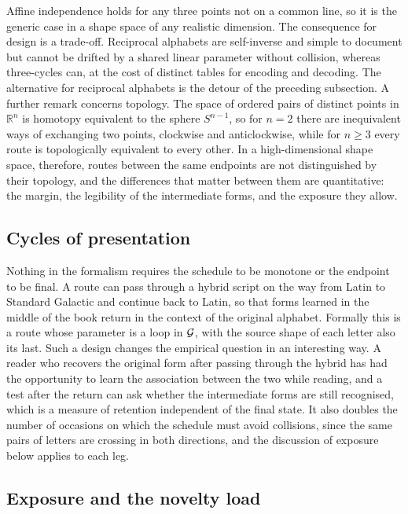 Affine independence holds for any three points not on a common line, so it is the generic case in a shape space of any realistic dimension. The consequence for design is a trade-off. Reciprocal alphabets are self-inverse and simple to document but cannot be drifted by a shared linear parameter without collision, whereas three-cycles can, at the cost of distinct tables for encoding and decoding. The alternative for reciprocal alphabets is the detour of the preceding subsection. A further remark concerns topology. The space of ordered pairs of distinct points in $\mathbb{R}^n$ is homotopy equivalent to the sphere $S^{n-1}$, so for $n=2$ there are inequivalent ways of exchanging two points, clockwise and anticlockwise, while for $n\ge3$ every route is topologically equivalent to every other. In a high-dimensional shape space, therefore, routes between the same endpoints are not distinguished by their topology, and the differences that matter between them are quantitative: the margin, the legibility of the intermediate forms, and the exposure they allow.

\subsection{Cycles of presentation}

Nothing in the formalism requires the schedule to be monotone or the endpoint to be final. A route can pass through a hybrid script on the way from Latin to Standard Galactic and continue back to Latin, so that forms learned in the middle of the book return in the context of the original alphabet. Formally this is a route whose parameter is a loop in $\mathcal{G}$, with the source shape of each letter also its last. Such a design changes the empirical question in an interesting way. A reader who recovers the original form after passing through the hybrid has had the opportunity to learn the association between the two while reading, and a test after the return can ask whether the intermediate forms are still recognised, which is a measure of retention independent of the final state. It also doubles the number of occasions on which the schedule must avoid collisions, since the same pairs of letters are crossing in both directions, and the discussion of exposure below applies to each leg.

\subsection{Exposure and the novelty load}

